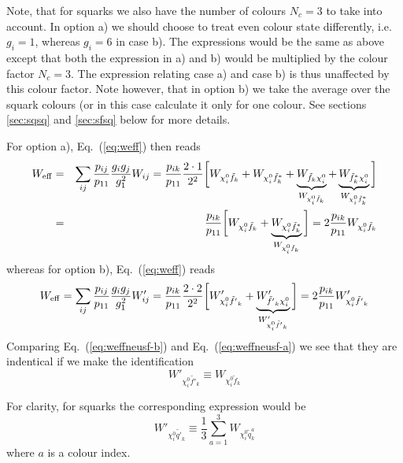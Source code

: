 Note, that for squarks we also have the number of colours $N_c=3$ to take into account.
In option a) we should choose to treat even colour state differently, i.e.\ $g_i=1$, whereas $g_i=6$ in case b). 
The expressions would be the same as above except that both the expression in a) and b) would be multiplied by the colour factor $N_c=3$. The expression relating case a) and case b) is thus unaffected by this colour factor. Note however, that in option b) we take the average over the squark colours (or in this case calculate it only for one colour. See sections \ref{sec:sqsq} and \ref{sec:sfsq} below for more details.

For option a), Eq.~(\ref{eq:weff}) then reads
\begin{eqnarray}
    W_{\rm eff} & = & \sum_{ij}\frac{p_{ij}}{p_{11}} 
    \frac{g_{i}g_{j}}{g_{1}^2} W_{ij}
    =
    \frac{p_{ik}}{p_{11}} \frac{2 \cdot 1}{2^2}
    \bigg[ 
    W_{\chi_{i}^0 \tilde{f}_{k}} +
    W_{\chi_{i}^0 \tilde{f}_{k}^*} +
    \underbrace{W_{\tilde{f}_{k} \chi_{i}^0}}_{W_{\chi_{i}^0 \tilde{f}_{k}}} +
    \underbrace{W_{\tilde{f}_{k}^{*} \chi_{i}^0}}_{W_{\chi_{i}^0 \tilde{f}_{k}^*}}
    \bigg] 
    \nonumber \\
    & = &
    \frac{p_{ik}}{p_{11}}
    \bigg[
    W_{\chi_{i}^0 \tilde{f}_{k}} +
    \underbrace{W_{\chi_{i}^0 \tilde{f}_{k}^*}}_{W_{\chi_{i}^0 \tilde{f}_{k}}}
    \bigg]
    =
    2 \frac{p_{ik}}{p_{11}}
    W_{\chi_{i}^0 \tilde{f}_{k}}
    \label{eq:weffneusf-a}
\end{eqnarray}
whereas for option b), Eq.~(\ref{eq:weff}) reads
\begin{equation}
    W_{\rm eff} = \sum_{ij}\frac{p_{ij}}{p_{11}} 
    \frac{g_{i}g_{j}}{g_{1}^2} W'_{ij}
    =
    \frac{p_{ik}}{p_{11}} \frac{2 \cdot 2}{2^2}
    \bigg[ 
    W'_{\chi_{i}^0 \tilde{f'}_{k}} +
    \underbrace{W'_{\tilde{f'}_{k} \chi_{i}^0}}_{W'_{\chi_{i}^0 \tilde{f'}_{k}}}
    \bigg] 
    =
    2 \frac{p_{ik}}{p_{11}}
    W'_{\chi_{i}^0 \tilde{f'}_{k}}
    \label{eq:weffneusf-b}
\end{equation}
Comparing Eq.~(\ref{eq:weffneusf-b}) and Eq.~(\ref{eq:weffneusf-a}) we 
see that they are indentical if we make the identification
\begin{equation}
    W'_{\chi_{i}^0 \tilde{f'}_{k}} \equiv W_{\chi_{i}^0 \tilde{f}_{k}}
\end{equation}

For clarity, for squarks the corresponding expression would be
\begin{equation}
    W'_{\chi_{i}^0 \tilde{q'}_{k}} \equiv
   \frac{1}{3}\sum_{a=1}^3 W_{\chi_{i}^0 \tilde{q}_{k}^a}
\end{equation}
where $a$ is a colour index.

